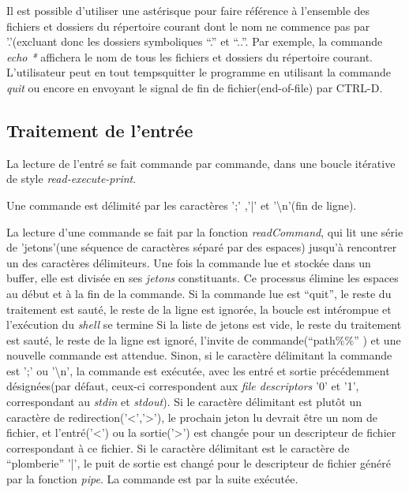 \documentclass[letterpaper,12pt]{scrartcl}
\begin{document}
			Il est possible d'utiliser une astérisque pour faire référence à l'ensemble des fichiers et dossiers du répertoire courant dont le nom ne commence pas par '.'(excluant donc les dossiers symboliques ``.'' et ``..''. Par exemple, la commande \textit{echo *} affichera le nom de tous les fichiers et dossiers du répertoire courant. L'utilisateur peut en tout tempsquitter le programme en utilisant la commande \textit{quit} ou encore en envoyant le signal de fin de fichier(end-of-file) par CTRL-D.

		    \subsection{Traitement de l'entrée}
            La lecture de l'entré se fait commande par commande, dans une boucle itérative de style \textit{read-execute-print}.
            
            Une commande est délimité par les caractères ';' ,'|' et '\textbackslash n'(fin de ligne).
            
            La lecture d'une commande se fait par la fonction \textit{readCommand}, qui lit une série de 'jetons'(une séquence de caractères séparé par des espaces) jusqu'à rencontrer un des caractères délimiteurs.
            Une fois la commande lue et stockée dans un buffer, elle est divisée en ses \textit{jetons} constituants. Ce processus élimine les espaces au début et à la fin de la commande.
            Si la commande lue est ``quit'', le reste du traitement est sauté, le reste de la ligne est ignorée, la boucle est intérompue et l'exécution du \textit{shell} se termine
            Si la liste de jetons est vide, le reste du traitement est sauté, le reste de la ligne est ignoré, l'invite de commande(``path\%\%'' ) et une nouvelle commande est attendue.                        
            Sinon, si le caractère délimitant la commande est ';' ou '\textbackslash n', la commande est exécutée, avec les entré et sortie précédemment désignées(par défaut, ceux-ci correspondent aux \textit{file descriptors} '0' et '1', correspondant au \textit{stdin} et \textit{stdout}).
            Si le caractère délimitant est plutôt un caractère de redirection('<','>'), le prochain jeton lu devrait être un nom de fichier, et l'entré('<') ou la sortie('>') est changée pour un descripteur de fichier correspondant à ce fichier.
            Si le caractère délimitant est le caractère de ``plomberie'' '|', le puit de sortie est changé pour le descripteur de fichier généré par la fonction \textit{pipe}. 
            La commande est par la suite exécutée.
            
\end{document}
